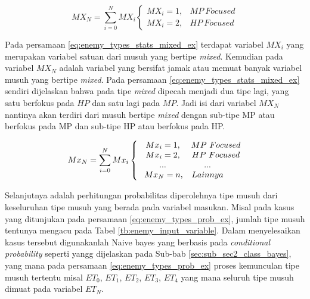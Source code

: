 \begin{equation}\label{eq:enemy_types_stats_mixed_ex}
MX_{N} = \sum_{i= 0}^{N} MX_{i} \left\{\begin{matrix}
MX_{i} = 1, & MP\ Focused\\
MX_{i} = 2, & HP\ Focused
\end{matrix}\right.
\end{equation}

Pada persamaan \ref{eq:enemy_types_stats_mixed_ex} terdapat variabel $MX_{i}$ yang merupakan variabel satuan dari musuh yang bertipe \textit{mixed}. Kemudian pada variabel $MX_{N}$ adalah variabel yang bersifat jamak atau memuat banyak variabel musuh yang bertipe \textit{mixed}. Pada persamaan \ref{eq:enemy_types_stats_mixed_ex} sendiri dijelaskan bahwa pada tipe \textit{mixed} dipecah menjadi dua tipe lagi, yang satu berfokus pada $HP$ dan satu lagi pada $MP$. Jadi isi dari variabel $MX_{N}$ nantinya akan terdiri dari musuh bertipe \textit{mixed} dengan sub-tipe MP atau berfokus pada MP dan sub-tipe HP atau berfokus pada HP.
\vspace{1ex}

\begin{equation}\label{eq:enemy_types_stats_mixed_adv}
Mx_{N} = \sum_{i= 0}^{N} Mx_{i} \left\{\begin{matrix}
\hspace{0.6em} Mx_{i} = 1, & MP\ Focused\\
\hspace{0.6em} Mx_{i} = 2, & HP\ Focused\\
\hspace{0.6em} ... & \hspace{-2.0em} ... \\
\hspace{0.8em} Mx_{N} = n, & \hspace{-2.0em} Lainnya\\
\end{matrix}\right.
\end{equation}

Selanjutnya adalah perhitungan probabilitas diperolehnya tipe musuh dari keseluruhan tipe musuh yang berada pada variabel masukan. Misal pada kasus yang ditunjukan pada persamaan \ref{eq:enemy_types_prob_ex}, jumlah tipe musuh tentunya mengacu pada Tabel \ref{tb:enemy_input_variable}. Dalam menyelesaikan kasus tersebut digunakanlah Naive bayes yang berbasis pada \textit{conditional probability} seperti yangg dijelaskan pada Sub-bab \ref{sec:sub_sec2_class_bayes}, yang mana pada persamaan \ref{eq:enemy_types_prob_ex} proses kemunculan tipe musuh tertentu misal $ET_{0}$, $ET_{1}$, $ET_{2}$, $ET_{3}$, $ET_{4}$ yang mana seluruh tipe musuh dimuat pada variabel $ET_{N}$.
\vspace{1ex}


